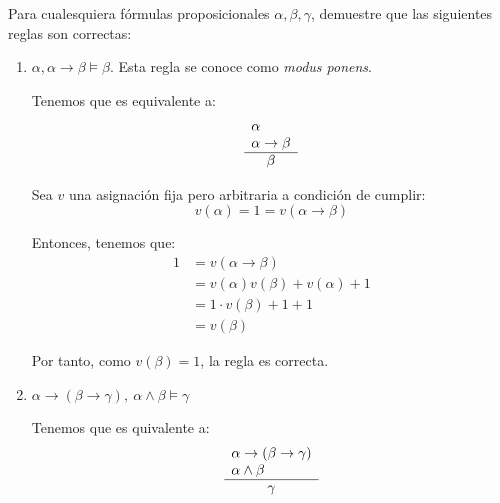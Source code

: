 \begin{ejercicio*}
    Para cualesquiera fórmulas proposicionales $\alpha,\beta,\gamma$, demuestre que las siguientes reglas son correctas:

    \begin{enumerate}
        \item $\alpha,\alpha\rightarrow\beta\vDash\beta$. Esta regla se conoce como \emph{modus ponens}.
        
        Tenemos que es equivalente a:
        \begin{equation*}
            \begin{array}{l}
                \alpha\\
                \alpha\rightarrow\beta\\ \hline
                \multicolumn{1}{c}{\beta}
            \end{array}
        \end{equation*}

        Sea $v$ una asignación fija pero arbitraria a condición de cumplir:
        \begin{equation*}
            v(\alpha)=1=v(\alpha\rightarrow\beta)
        \end{equation*}

        Entonces, tenemos que:
        \begin{align*}
            1 &= v(\alpha\rightarrow\beta)\\
            &= v(\alpha)v(\beta)+v(\alpha)+1\\
            &= 1\cdot v(\beta)+1+1\\
            &= v(\beta)
        \end{align*}

        Por tanto, como $v(\beta)=1$, la regla es correcta.

        \item $\alpha\rightarrow(\beta\rightarrow\gamma),~\alpha\land\beta \vDash \gamma$
        
        Tenemos que es quivalente a:
        \begin{equation*}
            \begin{array}{l}
                \alpha\rightarrow(\beta\rightarrow\gamma)\\
                \alpha\land\beta \\ \hline
                \multicolumn{1}{c}{\gamma}
            \end{array}
        \end{equation*}
        

\end{enumerate}
\end{ejercicio*}
